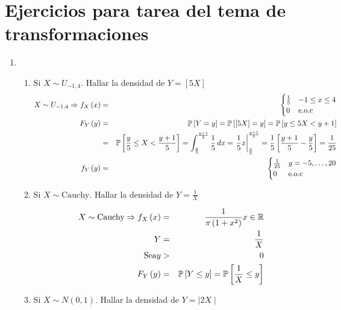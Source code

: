 \section{Ejercicios para tarea del tema de transformaciones}



\begin{enumerate}
\item 
\begin{enumerate}
\item Si $X \sim U_{-1,4}$. Hallar la densidad de $Y= \left[5X \right]$
 \begin{eqnarray*}
 X \sim U_{-1,4} \Rightarrow f_{X}\left(x \right)&=& \begin{cases} \frac{1}{5} & -1 \leq x \leq 4\\
 0 & \textrm{e.o.c}
 \end{cases}\\
 F_{Y} \left( y \right) &=& \mathbb{P} \left[Y=y \right]= \mathbb{P} \left[\left[5X \right]= y \right] = \mathbb{P} \left[ y \leq 5X < y+1 \right]\\
 &=& \mathbb{P} \left[\frac{y}{5}\leq X < \frac{y+1}{5} \right] = \int_{\frac{y}{5}}^{\frac{y+1}{5}} \frac{1}{5} \, dx = \left. \frac{1}{5}x \right|_{\frac{y}{5}}^{\frac{y+1}{5}} = \frac{1}{5} \left[ \frac{y+1}{5}- \frac{y}{5} \right]= \frac{1}{25}\\
 f_{Y}\left(y \right)&=&    \begin{cases} \frac{1}{25} & y= -5 , \ldots, 20\\
 0 & \textrm{e.o.c}
 \end{cases}
\end{eqnarray*}

\item Si $X \sim \textrm{Cauchy}$. Hallar la densidad de $Y= \frac{1}{X}$

\begin{eqnarray*}
 X \sim \textrm{Cauchy} \Rightarrow f_{X}\left(x \right)&=& \frac{1}{\pi \left(1+x^2 \right)} x \in \mathbb{R}\\
 Y&=& \frac{1}{X}\\
  \textrm{Sea} y&>&0\\
  F_{Y} \left(y \right)&=& \mathbb{P} \left[Y \leq y \right] = \mathbb{P} \left[ \frac{1}{X} \leq y \right] 
\end{eqnarray*}
\item Si $X \sim N \left(0,1 \right) $. Hallar la densidad de $Y= \mid2X\mid $


\end{enumerate}
\end{enumerate}
